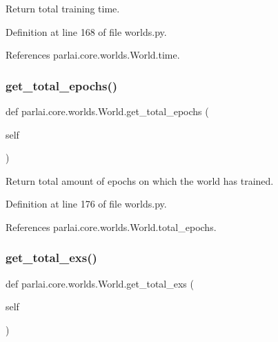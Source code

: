 \begin{DoxyVerb}Return total training time.\end{DoxyVerb}
 

Definition at line 168 of file worlds.\+py.



References parlai.\+core.\+worlds.\+World.\+time.

\mbox{\label{classparlai_1_1core_1_1worlds_1_1World_acf90b0f1a9ec1314b905159559b4d4ab}} 
\subsubsection{\texorpdfstring{get\+\_\+total\+\_\+epochs()}{get\_total\_epochs()}}
{\footnotesize\ttfamily def parlai.\+core.\+worlds.\+World.\+get\+\_\+total\+\_\+epochs (\begin{DoxyParamCaption}\item[{}]{self }\end{DoxyParamCaption})}

\begin{DoxyVerb}Return total amount of epochs on which the world has trained.\end{DoxyVerb}
 

Definition at line 176 of file worlds.\+py.



References parlai.\+core.\+worlds.\+World.\+total\+\_\+epochs.

\mbox{\label{classparlai_1_1core_1_1worlds_1_1World_a0f9926a92069bfb833a6c4a531d99b70}} 
\subsubsection{\texorpdfstring{get\+\_\+total\+\_\+exs()}{get\_total\_exs()}}
{\footnotesize\ttfamily def parlai.\+core.\+worlds.\+World.\+get\+\_\+total\+\_\+exs (\begin{DoxyParamCaption}\item[{}]{self }\end{DoxyParamCaption})}

